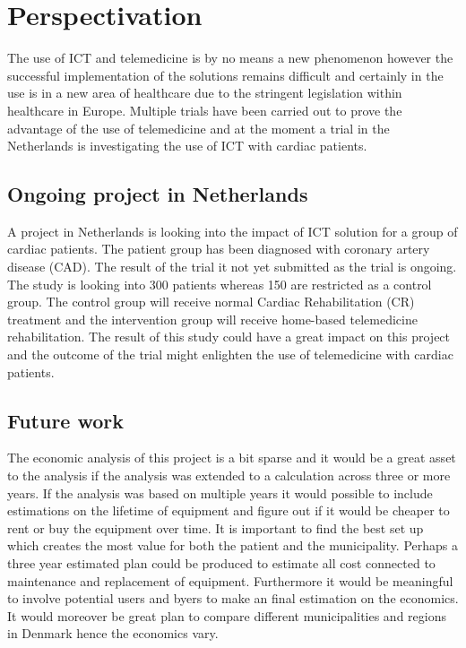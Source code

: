 
 




\chapter{Perspectivation}

The use of ICT and telemedicine is by no means a new phenomenon however the successful implementation of the solutions remains difficult and certainly in the use is in a new area of healthcare due to the stringent legislation within healthcare in Europe. Multiple trials have been carried out to prove the advantage of the use of telemedicine and at the moment a trial in the Netherlands is investigating the use of ICT with cardiac patients. 


\section{Ongoing project in Netherlands}

A project in Netherlands is looking into the impact of ICT solution for a group of cardiac patients. The patient group has been diagnosed with coronary artery disease (CAD). The result of the trial it not yet submitted as the trial is ongoing. The study is looking into 300 patients whereas 150 are restricted as a control group. The control group will receive normal Cardiac Rehabilitation (CR) treatment and the intervention group will receive home-based telemedicine rehabilitation\cite{CAD}. 
The result of this study could have a great impact on this project and the outcome of the trial might enlighten the use of telemedicine with cardiac patients.

\section{Future work}


The economic analysis of this project is a bit sparse and it would be a great asset to the analysis if the analysis was extended to a calculation across three or more years. If the analysis was based on multiple years it would possible to include estimations on the lifetime of equipment and figure out if it would be cheaper to rent or buy the equipment over time. It is important to find the best set up which creates the most value for both the patient and the municipality. Perhaps a three year estimated plan could be produced to estimate all cost connected to maintenance and replacement of equipment. Furthermore it would be meaningful to involve potential users and byers to make an final estimation on the economics. 
It would moreover be great plan to compare different municipalities and regions in Denmark hence the economics vary. \\


